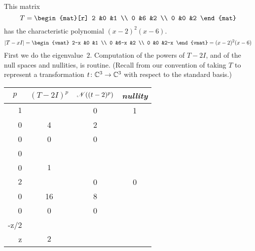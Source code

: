 \begin{example} \label{ex:FirstJordForm}
This matrix 
\begin{equation*}
   T=
   \begin{mat}[r]
     2  &0  &1  \\
     0  &6  &2  \\
     0  &0  &2
   \end{mat}
\end{equation*}
has the characteristic polynomial \( (x-2)^2(x-6) \).
\begin{equation*}
   |T-xI|=
   \begin{vmat}
     2-x  &0    &1  \\
     0    &6-x  &2  \\
     0    &0    &2-x
   \end{vmat}
   =(x-2)^2(x-6)
\end{equation*}
First we do the eigenvalue~$2$.
Computation of the powers of $T-2I$, and of the null spaces and nullities, 
is routine.
(Recall from  our convention
of taking $T$ to represent a transformation $\mbox{$t\colon \mathbb{C}^3\to \mathbb{C}^3$}$
with respect to the standard basis.)
\begin{center}
  \renewcommand{\arraystretch}{1.25}
  \begin{tabular}{r|ccc} 
    \multicolumn{1}{c}{\( p \)}  
         &\( (T-2I)^p \) &\( \mathscr{N}((t-2)^p)  \) 
         &\textit{nullity}                                            \\  
    \hline
    \( 1 \)
    &\matrixvenlarge{\begin{mat}[r]
          0  &0  &1  \\
          0  &4  &2  \\
          0  &0  &0
        \end{mat}}
    &\( \set{\matrixvenlarge{\colvec{x \\ 0 \\ 0}}
         \suchthat x\in\C}  \)  
    &$1$                                                   \\
    \( 2 \)
    &\matrixvenlarge{\begin{mat}[r]
          0  &0  &0  \\
          0  &16 &8  \\
          0  &0  &0
        \end{mat}}
    &\( \set{\matrixvenlarge{\colvec{x \\ -z/2 \\  z}}
               \suchthat x,z\in\C}  \) 
    &$2$                                                   \\

\end{tabular}
\end{center}
\end{example}
